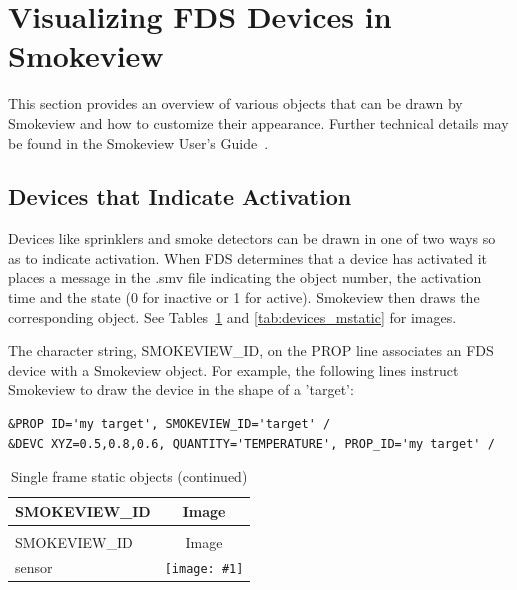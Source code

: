
\newcommand{\devicewidth}{1.5in}
\newcommand{\boxwidth}{3.0in}
\newcommand{\incgraphics}[1]{
\parbox[c]{\devicewidth}{
\vspace{0.01in}
\texttt{[image: \#1]}
\vspace{0.01in}
}
}

\section{Visualizing FDS Devices in Smokeview}

This section provides an overview of various objects that can be drawn by Smokeview and how to customize their appearance. Further technical details may be found in the Smokeview User's Guide~\cite{Smokeview_Users_Guide}.


\subsection{Devices that Indicate Activation}
\label{info:SMOKEVIEW_ID}

Devices like sprinklers and smoke detectors can be drawn in one of two ways so as to indicate activation. When FDS determines that a device has activated it places a message in the {\ct .smv} file indicating the object number, the activation time and the state (0 for inactive or 1 for active). Smokeview then draws the corresponding object. See Tables~\ref{tab:devices_static} and \ref{tab:devices_mstatic} for images.

The character string, {\ct SMOKEVIEW\_ID}, on the {\ct PROP} line associates an FDS device with a Smokeview object. For example, the following lines instruct Smokeview to draw the device in the shape of a {\ct 'target'}:
\begin{lstlisting}
&PROP ID='my target', SMOKEVIEW_ID='target' /
&DEVC XYZ=0.5,0.8,0.6, QUANTITY='TEMPERATURE', PROP_ID='my target' /
\end{lstlisting}


\begin{longtable}[t!]{|l|c|}
\caption{Single frame static objects}
\label{tab:devices_static}
\\ \hline
{\ct SMOKEVIEW\_ID} & Image  \\ \hline \hline
\endfirsthead
\caption{Single frame static objects (continued)} \\ \hline
{\ct SMOKEVIEW\_ID} & Image  \\ \hline \hline
\endhead

{\ct sensor} & \incgraphics{SCRIPT_FIGURES/sensor} \\ \hline
{\ct target} & \incgraphics{SCRIPT_FIGURES/target} \\ \hline

\end{longtable}

